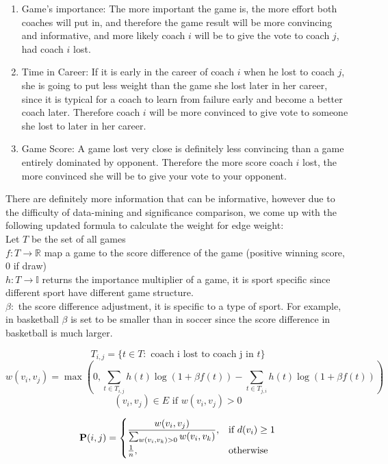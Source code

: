 \documentclass[titlepage]{article}
\begin{document}
\begin{enumerate}
\item Game's importance: The more important the game is, the more effort both coaches will put in, and therefore the game result will be more convincing and informative, and more likely coach $i$ will be to give the vote to coach $j$, had coach $i$ lost.
\item Time in Career: If it is early in the career of coach $i$ when he lost to coach $j$, she is going to put less weight than the game she lost later in her career, since it is typical for a coach to learn from failure early and become a better coach later. Therefore coach $i$ will be more convinced to give vote to someone she lost to later in her career.
\item Game Score: A game lost very close is definitely less convincing than a game entirely dominated by opponent. Therefore the more score coach $i$ lost, the more convinced she will be to give your vote to your opponent.
\end{enumerate}

\noindent There are definitely more information that can be informative, however due to the difficulty of data-mining and significance comparison, we come up with the following updated formula to calculate the weight for edge weight:
\\

\noindent Let $T$ be the set of all games
\\
$f: T \rightarrow \mathbb{R}$ map a game to the score difference of the game (positive winning score, 0 if draw)
\\
$h: T \rightarrow \mathbb{I}$ returns the importance multiplier of a game, it is sport specific since different sport have different game structure.
\\
$\beta: $ the score difference adjustment, it is specific to a type of sport. For example, in basketball $\beta$ is set to be smaller than in soccer since the score difference in basketball is much larger. 

$$ T_{i,j} = \{t \in T : \mbox{ coach i lost to coach j in } t\} $$
$$w(v_i, v_j) =  \max(0, \sum_{t \in T_{i, j}} h(t) \log(1 + \beta f(t)) - \sum_{t \in T_{j, i}} h(t) \log(1 + \beta f(t))) $$
$$(v_i, v_j) \in E \mbox{ if } w(v_i, v_j) > 0$$

\[
    {\bf P}(i, j)= 
\begin{cases}
    \dfrac{w(v_i, v_j)}{\sum_{w(v_i, v_k) > 0} w(v_i, v_k)},      & \text{if } d(v_i) \geq 1\\
    \frac{1}{n},              & \text{otherwise}
\end{cases}
\]
\\
\end{document}
